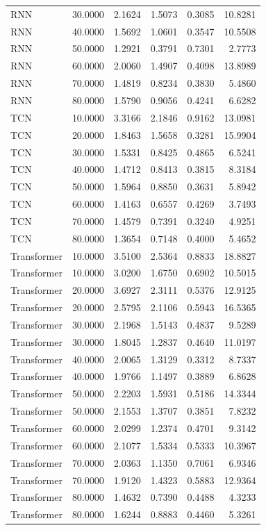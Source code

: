 \begin{tabular}{lrrrrr}
RNN & 30.0000 & 2.1624 & 1.5073 & 0.3085 & 10.8281 \\
RNN & 40.0000 & 1.5692 & 1.0601 & 0.3547 & 10.5508 \\
RNN & 50.0000 & 1.2921 & 0.3791 & 0.7301 & 2.7773 \\
RNN & 60.0000 & 2.0060 & 1.4907 & 0.4098 & 13.8989 \\
RNN & 70.0000 & 1.4819 & 0.8234 & 0.3830 & 5.4860 \\
RNN & 80.0000 & 1.5790 & 0.9056 & 0.4241 & 6.6282 \\
TCN & 10.0000 & 3.3166 & 2.1846 & 0.9162 & 13.0981 \\
TCN & 20.0000 & 1.8463 & 1.5658 & 0.3281 & 15.9904 \\
TCN & 30.0000 & 1.5331 & 0.8425 & 0.4865 & 6.5241 \\
TCN & 40.0000 & 1.4712 & 0.8413 & 0.3815 & 8.3184 \\
TCN & 50.0000 & 1.5964 & 0.8850 & 0.3631 & 5.8942 \\
TCN & 60.0000 & 1.4163 & 0.6557 & 0.4269 & 3.7493 \\
TCN & 70.0000 & 1.4579 & 0.7391 & 0.3240 & 4.9251 \\
TCN & 80.0000 & 1.3654 & 0.7148 & 0.4000 & 5.4652 \\
Transformer & 10.0000 & 3.5100 & 2.5364 & 0.8833 & 18.8827 \\
Transformer & 10.0000 & 3.0200 & 1.6750 & 0.6902 & 10.5015 \\
Transformer & 20.0000 & 3.6927 & 2.3111 & 0.5376 & 12.9125 \\
Transformer & 20.0000 & 2.5795 & 2.1106 & 0.5943 & 16.5365 \\
Transformer & 30.0000 & 2.1968 & 1.5143 & 0.4837 & 9.5289 \\
Transformer & 30.0000 & 1.8045 & 1.2837 & 0.4640 & 11.0197 \\
Transformer & 40.0000 & 2.0065 & 1.3129 & 0.3312 & 8.7337 \\
Transformer & 40.0000 & 1.9766 & 1.1497 & 0.3889 & 6.8628 \\
Transformer & 50.0000 & 2.2203 & 1.5931 & 0.5186 & 14.3344 \\
Transformer & 50.0000 & 2.1553 & 1.3707 & 0.3851 & 7.8232 \\
Transformer & 60.0000 & 2.0299 & 1.2374 & 0.4701 & 9.3142 \\
Transformer & 60.0000 & 2.1077 & 1.5334 & 0.5333 & 10.3967 \\
Transformer & 70.0000 & 2.0363 & 1.1350 & 0.7061 & 6.9346 \\
Transformer & 70.0000 & 1.9120 & 1.4323 & 0.5883 & 12.9364 \\
Transformer & 80.0000 & 1.4632 & 0.7390 & 0.4488 & 4.3233 \\
Transformer & 80.0000 & 1.6244 & 0.8883 & 0.4460 & 5.3261 \\
\bottomrule
\end{tabular}
